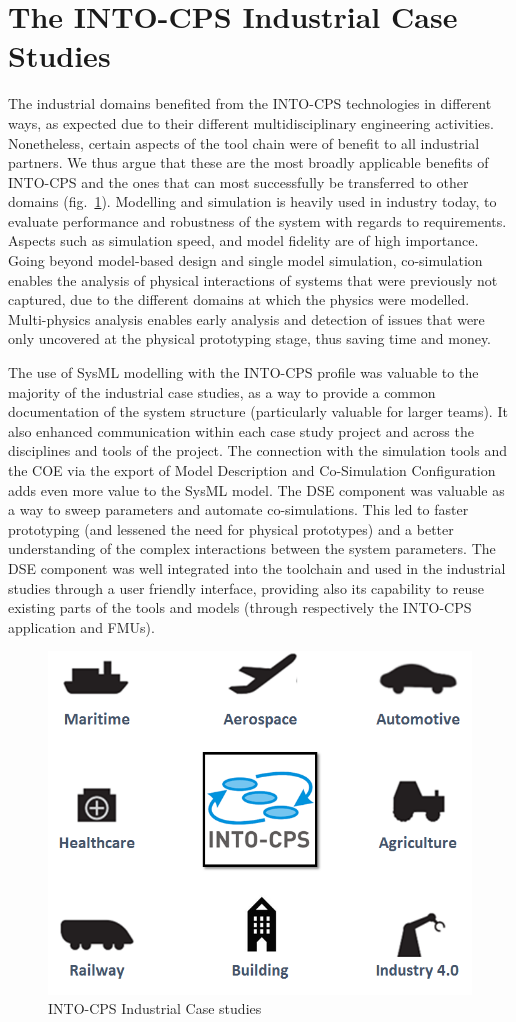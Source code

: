 
\section{The INTO-CPS Industrial Case Studies}\label{sec:casestudies}


The industrial domains benefited from the INTO-CPS technologies in different ways, as expected due to their different multidisciplinary engineering activities. Nonetheless, certain aspects of the tool chain were of benefit to all industrial partners. We thus argue that these are the most broadly applicable benefits of INTO-CPS and the ones that can most successfully be transferred to other domains (fig.~\ref{fig:industrial}).
Modelling and simulation is heavily used in industry today, to evaluate performance and robustness of the system with regards to requirements. Aspects such as simulation speed, and model fidelity are of high importance. Going beyond model-based design and single model simulation, co-simulation enables the analysis of physical interactions of systems that were previously not captured, due to the different domains at which the physics were modelled. Multi-physics analysis enables early analysis and detection of issues that were only uncovered at the physical prototyping stage, thus saving time and money.

The use of SysML modelling with the INTO-CPS profile was valuable to the majority of the industrial case studies, as a way to provide a common documentation of the system structure (particularly valuable for larger teams). It also enhanced communication within each case study project and across the disciplines and tools of the project. The connection with the simulation tools and the COE via the export of Model Description and Co-Simulation Configuration adds even more value to the SysML model.
The DSE component was valuable as a way to sweep parameters and automate co-simulations. This led to faster prototyping (and lessened the need for physical prototypes) and a better understanding of the complex interactions between the system parameters. The DSE component was well integrated into the toolchain and used in the industrial studies through a user friendly interface, providing also its capability to reuse existing parts of the tools and models (through respectively the INTO-CPS application and FMUs).

\begin{figure}[!ht]
	\centering
		\includegraphics[width=0.5 \textwidth]{./figures/industrial}
	\caption{INTO-CPS Industrial Case studies}
	\label{fig:industrial}
\end{figure}

